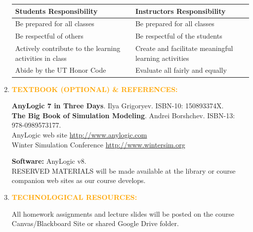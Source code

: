 \documentclass{article}
\begin{document}
\begin{enumerate}

\begin{tabular}{l|l}
\hline
Students Responsibility & Instructors Responsibility \\
\hline
\hline
 Be prepared for all classes & Be prepared for all classes \\
\hline 
Be respectful of others & Be respectful of the students \\
\hline
Actively contribute to the learning activities in class & Create and facilitate meaningful learning activities \\
\hline
Abide by the UT Honor Code & Evaluate all fairly and equally \\
\hline
\end{tabular}


\item \textcolor{orange}{\bf TEXTBOOK (OPTIONAL) \& REFERENCES:} 

{\bf AnyLogic 7 in Three Days}. Ilya Grigoryev. ISBN-10: 150893374X.\\
{\bf The Big Book of Simulation Modeling}. Andrei Borshchev. ISBN-13: 978-0989573177.\\
AnyLogic web site \url{http://www.anylogic.com}{}\\
Winter Simulation Conference \url{http://www.wintersim.org}

{\bf Software:} AnyLogic v8. \\
RESERVED MATERIALS will be made available at the library or course companion web sites as our course develops.

\item \textcolor{orange}{\bf TECHNOLOGICAL RESOURCES:} 


All homework assignments and lecture slides will be posted on the course Canvas/Blackboard Site or shared Google Drive folder. 


\end{enumerate}
\end{document}

